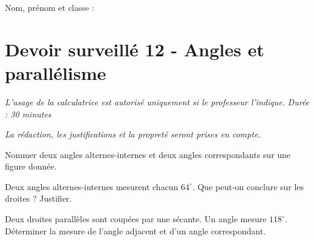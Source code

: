 \documentclass[a4paper,10pt]{report}
\begin{document}
\pagestyle{empty}
\noindent Nom, prénom et classe : \dotfill

\section*{Devoir surveillé 12 - Angles et parallélisme}

\noindent \textit{L'usage de la calculatrice est autorisé uniquement si le professeur l'indique.} \hfill \textit{Durée : 30 minutes}

\medskip
\noindent \textit{La rédaction, les justifications et la propreté seront prises en compte.}


\begin{ex}[Angles]
Nommer deux angles alternes-internes et deux angles correspondants sur une figure donnée.
\medskip\noindent\grandscarreaux{\linewidth}{4cm}
\end{ex}
\begin{ex}[Parallélisme]
Deux angles alternes-internes mesurent chacun $64^\circ$. Que peut-on conclure sur les droites ? Justifier.
\medskip\noindent\grandscarreaux{\linewidth}{3cm}
\end{ex}
\begin{ex}[Calcul]
Deux droites parallèles sont coupées par une sécante. Un angle mesure $118^\circ$. Déterminer la mesure de l'angle adjacent et d'un angle correspondant.
\medskip\noindent\grandscarreaux{\linewidth}{4cm}
\end{ex}
\end{document}
